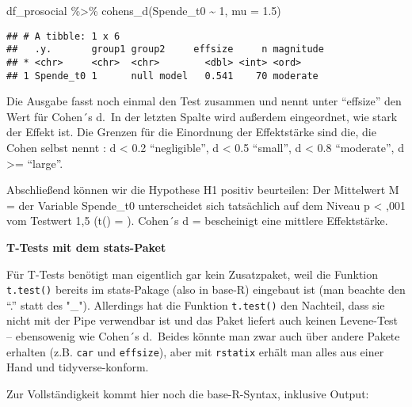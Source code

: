\documentclass[
]{book}
\newenvironment{Shaded}{\begin{snugshade}}{\end{snugshade}}
\newcommand{\AttributeTok}[1]{\textcolor[rgb]{0.77,0.63,0.00}{#1}}
\newcommand{\DecValTok}[1]{\textcolor[rgb]{0.00,0.00,0.81}{#1}}
\newcommand{\FloatTok}[1]{\textcolor[rgb]{0.00,0.00,0.81}{#1}}
\newcommand{\FunctionTok}[1]{\textcolor[rgb]{0.00,0.00,0.00}{#1}}
\newcommand{\NormalTok}[1]{#1}
\newcommand{\SpecialCharTok}[1]{\textcolor[rgb]{0.00,0.00,0.00}{#1}}
\newcommand{\StringTok}[1]{\textcolor[rgb]{0.31,0.60,0.02}{#1}}
\begin{document}
\begin{Shaded}
\begin{Highlighting}[]
\NormalTok{df\_prosocial }\SpecialCharTok{\%\textgreater{}\%} 
  \FunctionTok{cohens\_d}\NormalTok{(Spende\_t0 }\SpecialCharTok{\textasciitilde{}} \DecValTok{1}\NormalTok{, }\AttributeTok{mu =} \FloatTok{1.5}\NormalTok{) }
\end{Highlighting}
\end{Shaded}

\begin{verbatim}
## # A tibble: 1 x 6
##   .y.       group1 group2     effsize     n magnitude
## * <chr>     <chr>  <chr>        <dbl> <int> <ord>    
## 1 Spende_t0 1      null model   0.541    70 moderate
\end{verbatim}

Die Ausgabe fasst noch einmal den Test zusammen und nennt unter ``effsize'' den Wert für Cohen´s d.~In der letzten Spalte wird außerdem eingeordnet, wie stark der Effekt ist. Die Grenzen für die Einordnung der Effektstärke sind die, die Cohen selbst nennt \citep{Cohen_1992}: \textbar d\textbar{} \textless{} 0.2 ``negligible'', \textbar d\textbar{} \textless{} 0.5 ``small'', \textbar d\textbar{} \textless{} 0.8 ``moderate'', \textbar d\textbar{} \textgreater= ``large''.

Abschließend können wir die Hypothese H1 positiv beurteilen: Der Mittelwert M =  der Variable Spende\_t0 unterscheidet sich tatsächlich auf dem Niveau p \textless{} ,001 vom Testwert 1,5 (t() = ). Cohen´s d =  bescheinigt eine mittlere Effektstärke.

\leavevmode\hypertarget{info_levene}{}%
\textbf{T-Tests mit dem stats-Paket}

Für T-Tests benötigt man eigentlich gar kein Zusatzpaket, weil die Funktion \texttt{t.test()} bereits im stats-Pakage (also in base-R) eingebaut ist (man beachte den ``.'' statt des "\_"). Allerdings hat die Funktion \texttt{t.test()} den Nachteil, dass sie nicht mit der Pipe verwendbar ist und das Paket liefert auch keinen Levene-Test -- ebensowenig wie Cohen´s d.~Beides könnte man zwar auch über andere Pakete erhalten (z.B. \texttt{car} und \texttt{effsize}), aber mit \texttt{rstatix} erhält man alles aus einer Hand und tidyverse-konform.

Zur Vollständigkeit kommt hier noch die base-R-Syntax, inklusive Output:

\begin{Shaded}
\end{Shaded}
\end{document}
